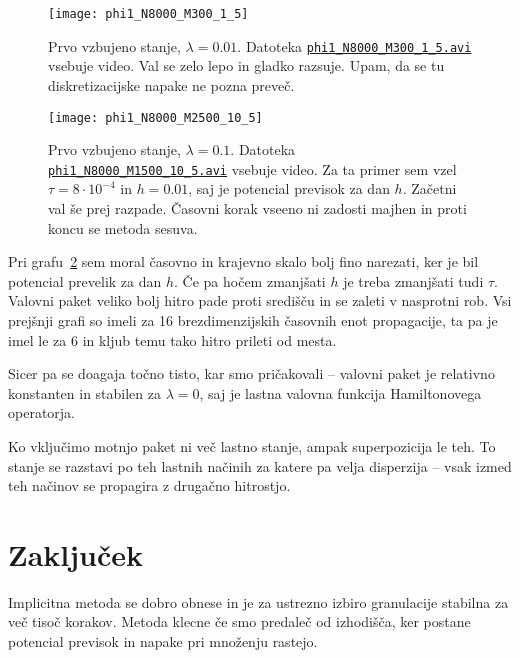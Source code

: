 \documentclass[a4 paper, 12pt]{article}
\begin{document}
\begin{figure}[H]
	\centering
	\texttt{[image: phi1\_N8000\_M300\_1\_5]}
	\vspace{-20pt}
	\caption{Prvo vzbujeno stanje, $\lambda=0.01$. Datoteka
		\href{phi1_N8000_M300_1_5.avi}{{\tt phi1\_N8000\_M300\_1\_5.avi}}
		vsebuje video. Val se zelo lepo in gladko razsuje. Upam, da se tu
		diskretizacijske napake ne pozna preveč.}
	\label{fig8}
	\vspace{-10pt}
\end{figure}

\begin{figure}[H]
	\centering
	\texttt{[image: phi1\_N8000\_M2500\_10\_5]}
	\vspace{-20pt}
	\caption{Prvo vzbujeno stanje, $\lambda=0.1$. Datoteka
		\href{phi1_N8000_M2500_10_5.avi}{{\tt phi1\_N8000\_M1500\_10\_5.avi}}
		vsebuje video. Za ta primer sem vzel $\tau = 8\cdot10^{-4}$ in
		$h = 0.01$, saj je potencial previsok za dan $h$. Začetni val še prej razpade.
		Časovni korak vseeno ni zadosti majhen in proti koncu se metoda sesuva.}
	\label{fig9}
	\vspace{-10pt}
\end{figure}

Pri grafu~\ref{fig9} sem moral časovno in krajevno skalo bolj fino narezati, ker je bil
potencial prevelik za dan $h$. Če pa hočem zmanjšati $h$ je treba zmanjšati tudi $\tau$.
Valovni paket veliko bolj hitro pade proti središču in se zaleti v nasprotni rob. Vsi prejšnji
grafi so imeli za 16 brezdimenzijskih časovnih enot propagacije, ta pa je imel le za 6 in
kljub temu tako hitro prileti od mesta.

Sicer pa se doagaja točno tisto, kar smo pričakovali -- valovni paket je relativno konstanten 
in stabilen za $\lambda = 0$, saj je lastna valovna funkcija Hamiltonovega operatorja.

Ko vključimo motnjo paket ni več lastno stanje, ampak superpozicija le teh. To stanje se
razstavi po teh lastnih načinih za katere pa velja disperzija -- vsak izmed teh načinov se
propagira z drugačno hitrostjo.

\section{Zaključek}

Implicitna metoda se dobro obnese in je za ustrezno izbiro granulacije stabilna za več tisoč
korakov. Metoda klecne če smo predaleč od izhodišča, ker postane potencial previsok in
napake pri množenju rastejo.
\end{document}
